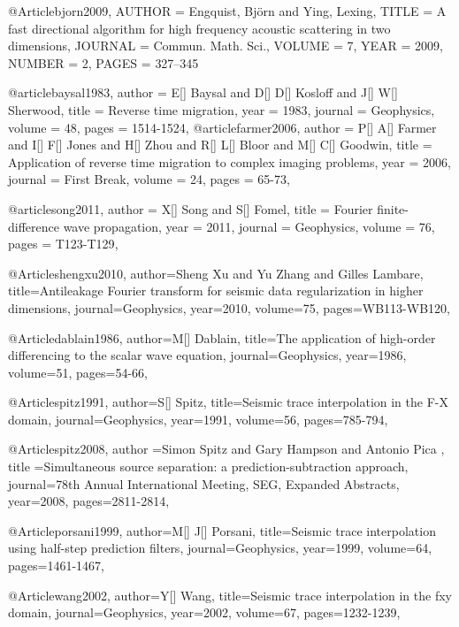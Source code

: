 {@Article{bjorn2009,
   AUTHOR = {Engquist, Bj{\"o}rn and Ying, Lexing},
   TITLE = {A fast directional algorithm for high frequency acoustic 
            scattering in two dimensions},
   JOURNAL = {Commun. Math. Sci.}, 
   VOLUME = {7}, 
   YEAR = {2009}, 
   NUMBER = {2},
   PAGES = {327--345} 
}

@article{baysal1983,
  author =	 {E[] Baysal and D[] D[] Kosloff and J[] W[] Sherwood},
  title =	 {Reverse time migration},
  year =	 1983,
  journal =	 {Geophysics},
  volume =	 48,
  pages =	 {1514-1524},
}
@article{farmer2006,
  author =	 {P[] A[] Farmer and I[] F[] Jones and H[] Zhou and R[] L[] Bloor and M[] C[] Goodwin},
  title =	 {Application of reverse time migration to complex imaging problems},
  year =	 2006,
  journal =	 {First Break},
  volume =	 24,
  pages =	 {65-73},
}

@article{song2011,
  author =	 {X[] Song and S[] Fomel},
  title =	 {Fourier finite-difference wave propagation},
  year =	 2011,
  journal =	 {Geophysics},
  volume =	 76,
  pages =	 {T123-T129},
}

@Article{shengxu2010,
  author={Sheng Xu and Yu Zhang and Gilles Lambare},
  title={Antileakage Fourier transform for seismic data regularization in higher dimensions},
  journal={Geophysics},
  year=2010,
  volume=75,
  pages={WB113-WB120},
}

@Article{dablain1986,
  author={M[] Dablain},
  title={The application of high-order differencing to the scalar wave equation},
  journal={Geophysics},
  year=1986,
  volume=51,
  pages={54-66},
}

@Article{spitz1991,
  author={S[] Spitz},
  title={Seismic trace interpolation in the F-X domain},
  journal={Geophysics},
  year=1991,
  volume=56,
  pages={785-794},
}

@Article{spitz2008,
  author ={Simon Spitz and Gary Hampson and Antonio Pica },
  title ={Simultaneous source separation: a prediction-subtraction approach},
  journal={78th Annual International Meeting, SEG, Expanded Abstracts},
  year=2008,
  pages={2811-2814},
}

@Article{porsani1999,
  author={M[] J[] Porsani},
  title={Seismic trace interpolation using half-step prediction filters},
  journal={Geophysics},
  year=1999,
  volume=64,
  pages={1461-1467},
}

@Article{wang2002,
  author={Y[] Wang},
  title={Seismic trace interpolation in the fxy domain},
  journal={Geophysics},
  year=2002,
  volume=67,
  pages={1232-1239},
}

}
